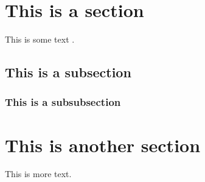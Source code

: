 \section{This is a section}
This is some text \cite{dirac}.
\subsection{This is a subsection}
\subsubsection{This is a subsubsection}
\section{This is another section}
This is more text.


